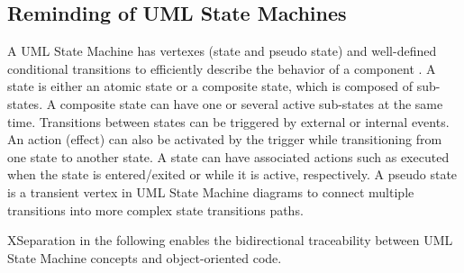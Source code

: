 \subsection{Reminding of UML State Machines} 
A UML State Machine has vertexes (state and pseudo state) and well-defined conditional transitions to efficiently describe the behavior of a component \cite{possepapyrusrt, Ringert2013}.
A state is either an atomic state or a composite state, which is composed of sub-states. 
A composite state can have one or several active sub-states at the same time. %
Transitions between states can be triggered by external or internal events. 
An action (effect) can also be activated by the trigger while transitioning from one state to another state. 
A state can have associated actions such as  executed when the state is entered/exited or while it is active, respectively. 
A pseudo state is a transient vertex in UML State Machine diagrams to connect multiple transitions into more complex state transitions paths.


XSeparation in the following enables the bidirectional traceability between UML State Machine concepts and object-oriented code.

	
